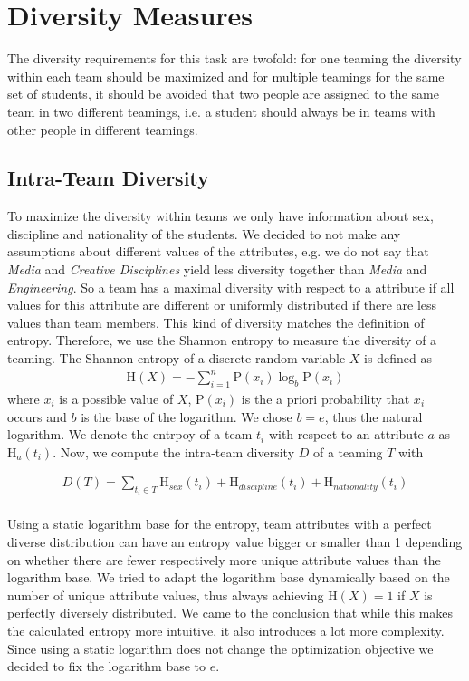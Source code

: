 \documentclass[12pt,a4paper]{article}
\begin{document}
\section{Diversity Measures} 
\label{sec:diversity}
The diversity requirements for this task are twofold: for one teaming the diversity within each team should be maximized and for multiple teamings for the same set of students, it should be avoided that two people are assigned to the same team in two different teamings, i.e. a student should always be in teams with other people in different teamings.

\subsection{Intra-Team Diversity}
\label{sec:intra-team}
To maximize the diversity within teams we only have information about sex, discipline and nationality of the students. We decided to not make any assumptions about different values of the attributes, e.g. we do not say that \emph{Media} and \emph{Creative Disciplines} yield less diversity together than \emph{Media} and \emph{Engineering}. So a team has a maximal diversity with respect to a attribute if all values for this attribute are different or uniformly distributed if there are less values than team members. This kind of diversity matches the definition of entropy. Therefore, we use the Shannon entropy to measure the diversity of a teaming. The Shannon entropy of a discrete random variable $X$ is defined as
\begin{align*}
    \mathrm {H} (X)=-\sum _{i=1}^{n}{\mathrm{P} (x_{i})\log _{b}\mathrm {P} (x_{i})}
\end{align*}
where $x_i$ is a possible value of $X$, $\mathrm{P}(x_{i})$ is the a priori probability that $x_i$ occurs and $b$ is the base of the logarithm. We chose $b=e$, thus the natural logarithm. We denote the entrpoy of a team $t_i$ with respect to an attribute $a$ as $\mathrm{H}_a(t_i)$. Now, we compute the intra-team diversity $D$ of a teaming $T$ with

\begin{align*}
    D(T) = \sum_{t_i \in T} {\mathrm{H}_{sex}(t_i) + \mathrm{H}_{discipline}(t_i) + \mathrm{H}_{nationality}(t_i)}  
\end{align*}
\\
Using a static logarithm base for the entropy, team attributes with a perfect diverse distribution can have an entropy value bigger or smaller than 1 depending on whether there are fewer respectively more unique attribute values than the logarithm base.
We tried to adapt the logarithm base dynamically based on the number of unique attribute values, thus always achieving $\mathrm{H}(X)=1$ if $X$ is perfectly diversely distributed.
We came to the conclusion that while this makes the calculated entropy more intuitive, it also introduces a lot more complexity. \\
Since using a static logarithm does not change the optimization objective we decided to fix the logarithm base to $e$.
\end{document}

